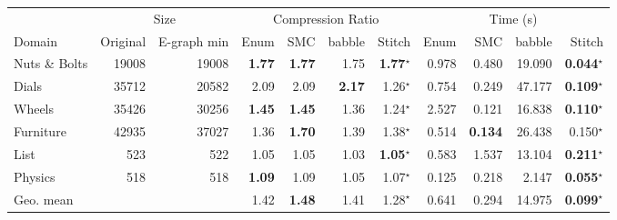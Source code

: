 \begin{tabular}{l r r rrrr rrrr}
\toprule
& \multicolumn{2}{c}{Size} & \multicolumn{4}{c}{Compression Ratio} & \multicolumn{4}{c}{Time (s)} \\
\cmidrule(lr){2-3} \cmidrule(lr){4-7} \cmidrule(lr){8-11}
Domain & Original & E-graph min & Enum & SMC & babble & Stitch & Enum & SMC & babble & Stitch \\
\midrule
Nuts \& Bolts & 19008 & 19008 & \textbf{1.77} & \textbf{1.77} & 1.75 & \textbf{1.77}$^{\star}$ & 0.978 & 0.480 & 19.090 & \textbf{0.044}$^{\star}$ \\
Dials & 35712 & 20582 & 2.09 & 2.09 & \textbf{2.17} & 1.26$^{\star}$ & 0.754 & 0.249 & 47.177 & \textbf{0.109}$^{\star}$ \\
Wheels & 35426 & 30256 & \textbf{1.45} & \textbf{1.45} & 1.36 & 1.24$^{\star}$ & 2.527 & 0.121 & 16.838 & \textbf{0.110}$^{\star}$ \\
Furniture & 42935 & 37027 & 1.36 & \textbf{1.70} & 1.39 & 1.38$^{\star}$ & 0.514 & \textbf{0.134} & 26.438 & 0.150$^{\star}$ \\
List & 523 & 522 & 1.05 & 1.05 & 1.03 & \textbf{1.05}$^{\star}$ & 0.583 & 1.537 & 13.104 & \textbf{0.211}$^{\star}$ \\
Physics & 518 & 518 & \textbf{1.09} & 1.09 & 1.05 & 1.07$^{\star}$ & 0.125 & 0.218 & 2.147 & \textbf{0.055}$^{\star}$ \\
\midrule
Geo. mean &  &  & 1.42 & \textbf{1.48} & 1.41 & 1.28$^{\star}$ & 0.641 & 0.294 & 14.975 & \textbf{0.099}$^{\star}$ \\
\bottomrule
\end{tabular}
